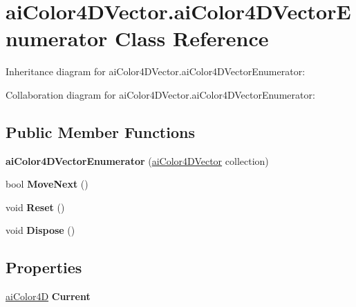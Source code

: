\hypertarget{classai_color4_d_vector_1_1ai_color4_d_vector_enumerator}{\section{ai\+Color4\+D\+Vector.\+ai\+Color4\+D\+Vector\+Enumerator Class Reference}
\label{classai_color4_d_vector_1_1ai_color4_d_vector_enumerator}
}


Inheritance diagram for ai\+Color4\+D\+Vector.\+ai\+Color4\+D\+Vector\+Enumerator\+:


Collaboration diagram for ai\+Color4\+D\+Vector.\+ai\+Color4\+D\+Vector\+Enumerator\+:
\subsection*{Public Member Functions}
\begin{DoxyCompactItemize}
\item 
\hypertarget{classai_color4_d_vector_1_1ai_color4_d_vector_enumerator_ae4bc47ce7374c87ff78265c898ea21e5}{{\bfseries ai\+Color4\+D\+Vector\+Enumerator} (\hyperlink{classai_color4_d_vector}{ai\+Color4\+D\+Vector} collection)}\label{classai_color4_d_vector_1_1ai_color4_d_vector_enumerator_ae4bc47ce7374c87ff78265c898ea21e5}

\item 
\hypertarget{classai_color4_d_vector_1_1ai_color4_d_vector_enumerator_a53f500c65e17887f175a134c74deb240}{bool {\bfseries Move\+Next} ()}\label{classai_color4_d_vector_1_1ai_color4_d_vector_enumerator_a53f500c65e17887f175a134c74deb240}

\item 
\hypertarget{classai_color4_d_vector_1_1ai_color4_d_vector_enumerator_a8a672354fcfaea5d88f6081b246ad3ab}{void {\bfseries Reset} ()}\label{classai_color4_d_vector_1_1ai_color4_d_vector_enumerator_a8a672354fcfaea5d88f6081b246ad3ab}

\item 
\hypertarget{classai_color4_d_vector_1_1ai_color4_d_vector_enumerator_aec80ef6b4f9401b1bc0aab60548f42db}{void {\bfseries Dispose} ()}\label{classai_color4_d_vector_1_1ai_color4_d_vector_enumerator_aec80ef6b4f9401b1bc0aab60548f42db}

\end{DoxyCompactItemize}
\subsection*{Properties}
\begin{DoxyCompactItemize}
\item 
\hypertarget{classai_color4_d_vector_1_1ai_color4_d_vector_enumerator_a41d2bc600384c2b4b7b25c09cb0cbf79}{\hyperlink{structai_color4_d}{ai\+Color4\+D} {\bfseries Current}}\label{classai_color4_d_vector_1_1ai_color4_d_vector_enumerator_a41d2bc600384c2b4b7b25c09cb0cbf79}

\end{DoxyCompactItemize}


